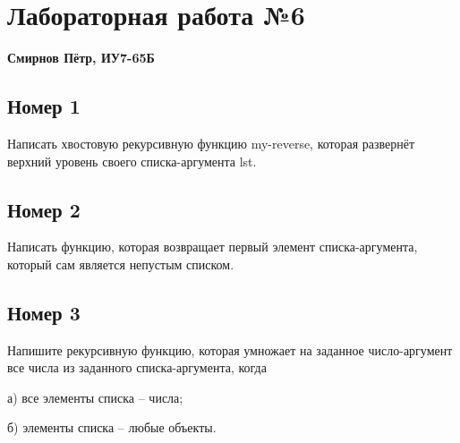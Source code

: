 \chapter{Лабораторная работа №6}

\textbf{Смирнов Пётр, ИУ7-65Б}

\section{Номер 1}

Написать хвостовую рекурсивную функцию my-reverse, которая развернёт верхний
уровень своего списка-аргумента lst.

\begin{figure}[H]
    \begin{listingbox}{}
        
    \end{listingbox}
    \label{lst:1}
\end{figure}

\section{Номер 2}

Написать функцию, которая возвращает первый элемент списка-аргумента, который 
сам является непустым списком.

\begin{figure}[H]
    \begin{listingbox}{}
        
    \end{listingbox}
    \label{lst:2}
\end{figure}

\section{Номер 3}

Напишите рекурсивную функцию, которая умножает на заданное число-аргумент 
все числа из заданного списка-аргумента, когда 

а) все элементы списка -- числа;

\begin{figure}[H]
    \begin{listingbox}{}
        
    \end{listingbox}
    \label{lst:3}
\end{figure}

б) элементы списка -- любые объекты.

